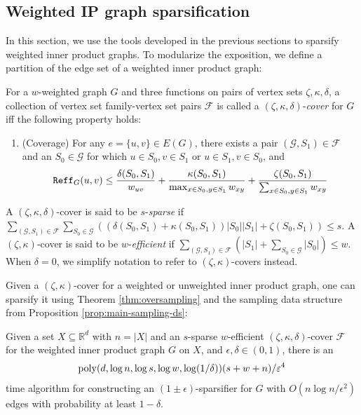 \subsection{Weighted IP graph sparsification}

In this section, we use the tools developed in the previous sections to sparsify weighted inner product graphs. To modularize the exposition, we define a partition of the edge set of a weighted inner product graph:

\begin{definition}
For a $w$-weighted graph $G$ and three functions on pairs of vertex sets $\zeta,\kappa,\delta$, a collection of vertex set family-vertex set pairs $\mathcal F$ is called a $(\zeta,\kappa,\delta)$-\emph{cover} for $G$ iff the following property holds:

\begin{enumerate}
    \item (Coverage) For any $e = \{u,v\}\in E(G)$, there exists a pair $(\mathcal G,S_1)\in \mathcal F$ and an $S_0\in \mathcal G$ for which $u\in S_0,v\in S_1$ or $u\in S_1,v\in S_0$, and
    $$\mathtt{Reff}_G(u,v)\le \frac{\delta(S_0,S_1)}{w_{uv}} + \frac{\kappa(S_0,S_1)}{\max_{x\in S_0,y\in S_1} w_{xy}} + \frac{\zeta(S_0,S_1)}{\sum_{x\in S_0,y\in S_1} w_{xy}}$$
\end{enumerate}

A $(\zeta,\kappa,\delta)$-cover is said to be $s$-\emph{sparse} if $\sum_{(\mathcal G,S_1)\in \mathcal{F}} \sum_{S_0\in \mathcal G} ((\delta(S_0,S_1) + \kappa(S_0,S_1))|S_0||S_1| + \zeta(S_0,S_1)) \le s$. A $(\zeta,\kappa)$-cover is said to be $w$-\emph{efficient} if $\sum_{(\mathcal G,S_1)\in \mathcal F} \left(|S_1| + \sum_{S_0\in \mathcal G} |S_0|\right)\le w$. When $\delta = 0$, we simplify notation to refer to $(\zeta,\kappa)$-covers instead.
\end{definition}

Given a $(\zeta,\kappa)$-cover for a weighted or unweighted inner product graph, one can sparsify it using Theorem \ref{thm:oversampling} and the sampling data structure from Proposition \ref{prop:main-sampling-ds}:

\begin{proposition}\label{prop:sparsify-given-cover}
Given a set $X\subseteq \mathbb{R}^d$ with $n = |X|$ and an $s$-sparse $w$-efficient $(\zeta,\kappa,\delta)$-cover $\mathcal F$ for the weighted inner product graph $G$ on $X$, and $\epsilon,\delta \in (0,1)$, there is an 
\begin{align*}
\mathrm{poly}(d,\log n,\log s,\log w,\log(1/\delta)) (s + w + n)/\varepsilon^4
\end{align*}
time algorithm for constructing an $(1\pm\epsilon)$-sparsifier for $G$ with $O(n\log n/\epsilon^2)$ edges with probability at least $1 - \delta$.
\end{proposition}

